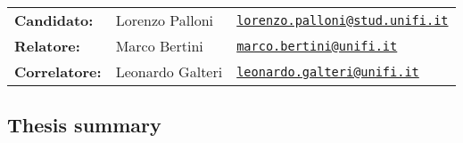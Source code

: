 \documentclass{article}
\begin{document}
\begin{table}[]
\centering
\caption*{\lipsum[1][1]}
\begin{tabular}{lll}
\textbf{Candidato:}   & Lorenzo Palloni & \href{mailto:lorenzo.palloni@stud.unifi.it}{\texttt{lorenzo.palloni@stud.unifi.it}} \\
\textbf{Relatore:}    & Marco Bertini & \href{mailto:marco.bertini@unifi.it}{\texttt{marco.bertini@unifi.it}} \\
\textbf{Correlatore:}    & Leonardo Galteri & \href{mailto:leonardo.galteri@unifi.it}{\texttt{leonardo.galteri@unifi.it}} \\

\end{tabular}
\end{table}
\subsection*{Thesis summary}

\lipsum
\end{document}
